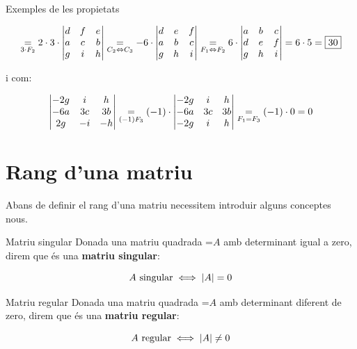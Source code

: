 \documentclass[11pt,a4paper]{article}
\newcommand{\fmm}[1]{\setbox0=\hbox{$#1$}\ifdim\wd0>\linewidth\fmdisp{#1}\else\mbox{\box0}\fi}
\newcommand{\fmdisp}[1]{\[\setbox2=\hbox{$\displaystyle #1$}\ifdim\wd2>\linewidth\resizebox{\linewidth}{!}{\box2}\else\box2\fi\]}
\begin{document}
\begin{fmex}{Exemples de les propietats}
\begin{enumerate}[label=\textbf{\arabic*.},leftmargin=*]
\fmdisp{\underset{3\cdot F_2}{=}2\cdot3\cdot\begin{vmatrix}d & f & e\\ a & c & b\\ g & i & h\end{vmatrix}\underset{C_2\Leftrightarrow C_3}{=}-6\cdot\begin{vmatrix}d & e & f\\ a & b & c\\ g & h & i\end{vmatrix}\underset{F_1\Leftrightarrow F_2}{=}6\cdot\begin{vmatrix}a & b & c\\ d & e & f\\ g & h & i\end{vmatrix}=6\cdot5=\boxed{30}}

i com:

\fmdisp{\begin{vmatrix}-2g & i & h\\ -6a & 3c & 3b\\ 2g & -i & -h\end{vmatrix}\underset{(-1)F_3}{=}(-1)\cdot\begin{vmatrix}-2g & i & h\\ -6a & 3c & 3b\\ -2g & i & h\end{vmatrix}\underset{F_1=F_3}{=}(-1)\cdot0=0}

\end{enumerate}
\end{fmex}

\section{Rang d'una matriu}\hypertarget{sec5}{}

Abans de definir el rang d'una matriu necessitem introduir alguns conceptes nous.

\begin{fmdef}{Matriu singular}
Donada una matriu quadrada \fmm{A} amb determinant igual a zero, direm que és una \textbf{matriu singular}:

\fmdisp{A\ \text{singular}\iff|A|=0}

\end{fmdef}

\begin{fmdef}{Matriu regular}
Donada una matriu quadrada \fmm{A} amb determinant diferent de zero, direm que és una \textbf{matriu regular}:

\fmdisp{A\ \text{regular}\iff|A|\neq0}

\end{fmdef}
\end{document}

